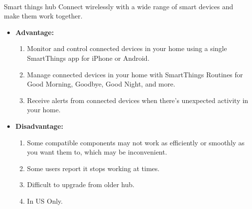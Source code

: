 \documentclass[12pt, oneside, a4paper]{book}
\newcommand\boldcolor[1]{\textcolor{bold}{\textbf{#1}}}
\begin{document}
		\paragraph{}Smart things hub Connect wirelessly with a wide range of smart devices and make them work together\cite{samsung}.
		\begin{itemize}
			\item \boldcolor{Advantage:}
			\begin{enumerate}
				\item Monitor and control connected devices in your home using a single SmartThings app for iPhone or Android.
				\item Manage connected devices in your home with SmartThings Routines for Good Morning, Goodbye, Good Night, and more.
				\item Receive alerts from connected devices when there’s unexpected activity in your home.
				
			\end{enumerate}
			\item \boldcolor{Disadvantage:} 
			\begin{enumerate}
				\item Some compatible components may not work as efficiently or smoothly as you want them to, which may be inconvenient.
				\item Some users report it stops working at times.
				\item Difficult to upgrade from older hub.
				\item In US Only.
			\end{enumerate}
		\end{itemize}
\end{document}

